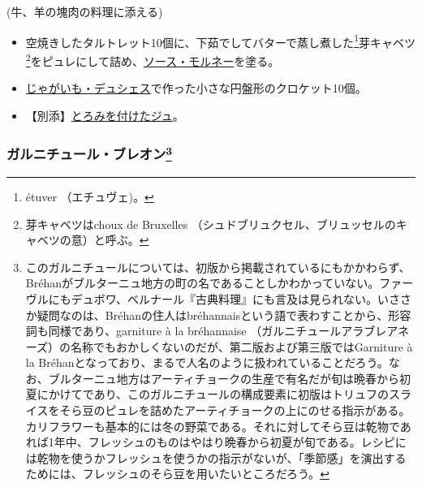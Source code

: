 \begin{recette}


(牛、羊の塊肉の料理に添える)

\begin{itemize}
\item
  空焼きしたタルトレット10個に、下茹でしてバターで蒸し煮した\footnote{étuver
    （エチュヴェ)。}芽キャベツ\footnote{芽キャベツはchoux de Bruxelles
    （シュドブリュクセル、ブリュッセルのキャベツの意）と呼ぶ。}をピュレにして詰め、\protect\hyperlink{sauce-mornay}{ソース・モルネー}を塗る。
\item
  \protect\hyperlink{pommes-de-terre-duchesse}{じゃがいも・デュシェス}で作った小さな円盤形のクロケット10個。
\item
  【別添】\protect\hyperlink{jus-de-veau-lie}{とろみを付けたジュ}。
\end{itemize}

\atoaki{}

\hypertarget{garniture-brehan}{%
\subsubsection[ガルニチュール・ブレオン]{\texorpdfstring{ガルニチュール・ブレオン\footnote{このガルニチュールについては、初版から掲載されているにもかかわらず、Bréhanがブルターニュ地方の町の名であることしかわかっていない。ファーヴルにもデュボワ、ベルナール『古典料理』にも言及は見られない。いささか疑問なのは、Bréhanの住人はbréhannaisという語で表わすことから、形容詞も同様であり、garniture
  à la bréhannaise
  （ガルニチュールアラブレアネーズ）の名称でもおかしくないのだが、第二版および第三版ではGarniture
  à la
  Bréhanとなっており、まるで人名のように扱われていることだろう。なお、ブルターニュ地方はアーティチョークの生産で有名だが旬は晩春から初夏にかけてであり、このガルニチュールの構成要素に初版はトリュフのスライスをそら豆のピュレを詰めたアーティチョークの上にのせる指示がある。カリフラワーも基本的には冬の野菜である。それに対してそら豆は乾物であれば1年中、フレッシュのものはやはり晩春から初夏が旬である。レシピには乾物を使うかフレッシュを使うかの指示がないが、「季節感」を演出するためには、フレッシュのそら豆を用いたいところだろう。}}{ガルニチュール・ブレオン}}\label{garniture-brehan}}


\end{recette}
